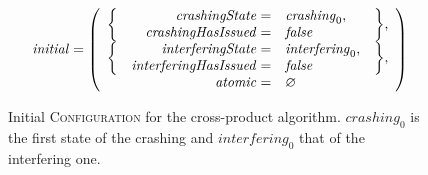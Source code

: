 \begin{figure}
  \begin{displaymath}
    \mathit{initial} = \left(\begin{array}{rrll}
      \multirow{2}{*}{\bigg\{} & \mathit{crashingState} = & \mathit{crashing}_0, & \multirow{2}{*}{\bigg\},} \\
                               & \mathit{crashingHasIssued} = & \false\\
      \multirow{2}{*}{\bigg\{} & \mathit{interferingState} = & \mathit{interfering}_0, & \multirow{2}{*}{\bigg\},} \\
                               & \mathit{interferingHasIssued} = & \false\\
      \multicolumn{2}{r}{\mathit{atomic} = } & \varnothing \\
    \end{array}\right)
  \end{displaymath}
  \caption{Initial \textsc{Configuration} for the cross-product
    algorithm.  $\mathit{crashing}_0$ is the first state of the
    crashing {\StateMachine} and $\mathit{interfering}_0$ that of the
    interfering one.}
  \label{fig:cross_product:initial}
\end{figure}


